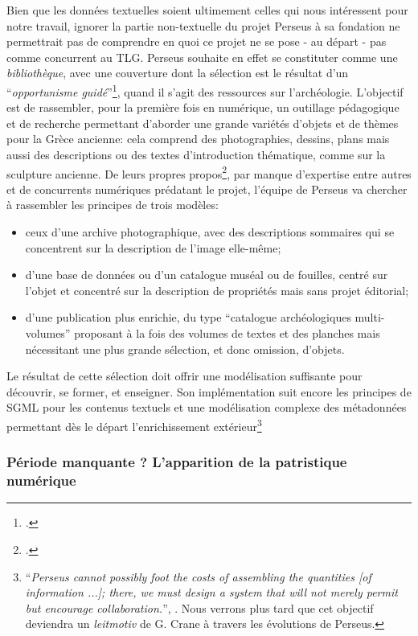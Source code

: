 Bien que les données textuelles soient ultimement celles qui nous intéressent pour notre travail, ignorer la partie non-textuelle du projet Perseus à sa fondation ne permettrait pas de comprendre en quoi ce projet ne se pose - au départ - pas comme concurrent au TLG. Perseus souhaite en effet se constituter comme une \textit{bibliothèque}, avec une couverture dont la sélection est le résultat d'un \enquote{\textit{opportunisme guidé}}\footcite[p. 145]{mylonas_perseus_1993}, quand il s'agit des ressources sur l'archéologie. L'objectif est de rassembler, pour la première fois en numérique, un outillage pédagogique et de recherche permettant d'aborder une grande variétés d'objets et de thèmes pour la Grèce ancienne: cela comprend des photographies, dessins, plans mais aussi des descriptions ou des textes d'introduction thématique, comme sur la sculpture ancienne. De leurs propres propos\footcite[p. 143]{mylonas_perseus_1993}, par manque d'expertise entre autres et de concurrents numériques prédatant le projet, l'équipe de Perseus va chercher à rassembler les principes de trois modèles:
\begin{itemize}
    \item ceux d'une archive photographique, avec des descriptions sommaires qui se concentrent sur la description de l'image elle-même;
    \item d'une base de données ou d'un catalogue muséal ou de fouilles, centré sur l'objet et concentré sur la description de propriétés mais sans projet éditorial;
    \item d'une publication plus enrichie, du type \enquote{catalogue archéologiques multi-volumes}  proposant à la fois des volumes de textes et des planches mais nécessitant une plus grande sélection, et donc omission, d'objets.
\end{itemize}
Le résultat de cette sélection doit offrir une modélisation suffisante pour découvrir, se former, et enseigner. Son implémentation suit encore les principes de SGML pour les contenus textuels et une modélisation complexe des métadonnées permettant dès le départ l'enrichissement extérieur\footnote{\enquote{\textit{Perseus cannot possibly foot the costs of assembling the quantities {[of information ...]}; there, we must design a system that will not merely permit but encourage collaboration.}}, \cite[p. 148]{mylonas_perseus_1993}. Nous verrons plus tard que cet objectif deviendra un \textit{leitmotiv} de G. Crane à travers les évolutions de Perseus.}

\subsubsection{Période manquante ? L'apparition de la patristique numérique}

